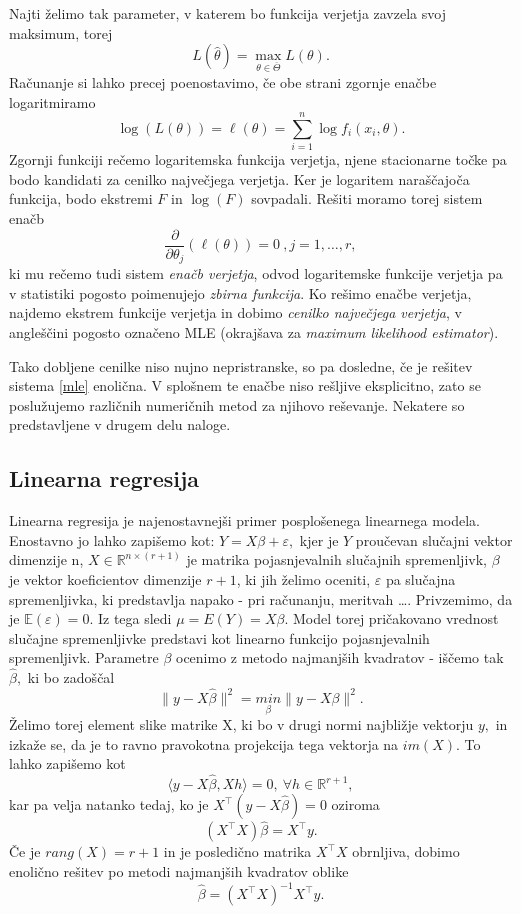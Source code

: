 \documentclass[12pt,a4paper]{amsart}
\theoremstyle{definition} %
\theoremstyle{plain} %
\begin{document}
Najti želimo tak parameter, v katerem bo funkcija verjetja zavzela svoj maksimum, torej 
\[
    L(\hat{\theta}) = \underset{\theta \in \overline{\Theta}}{\max}{L(\theta)}.
\]
Računanje si lahko precej poenostavimo, če obe strani zgornje enačbe logaritmiramo
\begin{equation}
    \log(L(\theta)) = \ell(\theta) = \sum_{i=1}^{n}\log f_{i}(x_{i},\theta).
\end{equation}
Zgornji funkciji rečemo logaritemska funkcija verjetja, njene stacionarne točke pa bodo kandidati za cenilko največjega verjetja. Ker je logaritem 
naraščajoča funkcija, bodo ekstremi $F$ in $\log (F)$ sovpadali. Rešiti moramo torej sistem enačb
\begin{equation}\label{mle}
    \frac{\partial}{\partial \theta_{j}}(\ell(\theta)) = 0~,j=1,\ldots,r,
\end{equation}
ki mu rečemo tudi sistem \textit{enačb verjetja}, odvod logaritemske funkcije verjetja pa v statistiki pogosto poimenujejo \textit{zbirna funkcija}.
Ko rešimo enačbe verjetja, najdemo ekstrem funkcije verjetja in dobimo \textit{cenilko največjega verjetja}, v angleščini pogosto označeno MLE (okrajšava za
\textit{maximum likelihood estimator}).

Tako dobljene cenilke niso nujno nepristranske, so pa dosledne, če je rešitev sistema \eqref{mle} enolična. V splošnem te enačbe niso rešljive eksplicitno, zato se poslužujemo različnih
numeričnih metod za njihovo reševanje. Nekatere so predstavljene v drugem delu naloge.

\subsection{Linearna regresija} %
Linearna regresija je najenostavnejši primer posplošenega linearnega modela. Enostavno jo lahko zapišemo kot:
$
    Y = X \beta + \varepsilon,
$
kjer je $Y$ proučevan slučajni vektor dimenzije n, $X \in \mathbb{R}^{n\times (r+1)} $ je matrika pojasnjevalnih slučajnih spremenljivk, $\beta$ je vektor koeficientov dimenzije $r+1$, 
ki jih želimo oceniti, $\varepsilon$ pa slučajna spremenljivka, ki predstavlja napako - pri računanju, meritvah \ldots. Privzemimo, da je $\mathbb{E}(\varepsilon) = 0$. Iz tega sledi
$\mu = E(Y) = X\beta$. Model torej pričakovano vrednost slučajne spremenljivke predstavi kot linearno funkcijo pojasnjevalnih spremenljivk.
Parametre $\beta$ ocenimo z metodo najmanjših kvadratov - iščemo tak $\hat{\beta}, $ ki bo zadoščal
\[
    \lVert y - X\hat{\beta} \rVert^2 = \underset{\beta}{min}\lVert y-X\beta\rVert^2.
\]
Želimo torej element slike matrike X, ki bo v drugi normi najbližje vektorju $y, $ in izkaže se, da je to ravno pravokotna projekcija tega vektorja na $im(X).$ To lahko zapišemo kot
\[
    \langle y-X\hat{\beta}, Xh \rangle = 0,~\forall h\in\mathbb{R}^{r+1},
\]
kar pa velja natanko tedaj, ko je $X^\top(y-X\hat{\beta}) = 0$ oziroma
\begin{equation*}
    (X^\top X)\hat{\beta} = X^\top y.
\end{equation*}
Če je $rang(X) = r+1$ in je posledično matrika $X^\top X$ obrnljiva, dobimo enolično rešitev po metodi najmanjših kvadratov oblike 
\[
    \hat{\beta} =  (X^\top X)^{-1}X^\top y.
\]
\end{document}
